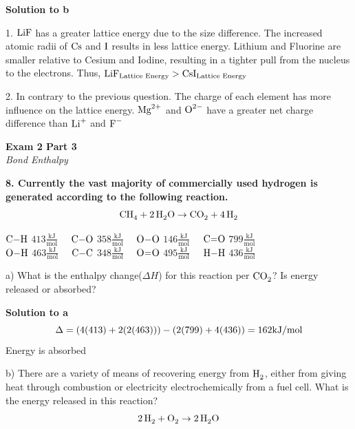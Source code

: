 \documentclass{article}
\begin{document}
    \textbf{Solution to b}

    1. $\ce{LiF}$ has a greater lattice energy due to the size difference. The increased atomic radii of $\ce{Cs}$ and $\ce{I}$ results in less lattice energy. Lithium and Fluorine are smaller relative to Cesium and Iodine, resulting in a tighter pull from the nucleus to the electrons. Thus, $\ce{LiF}_{\text{Lattice Energy}} > \ce{CsI}_{\text{Lattice Energy}}$

    2. In contrary to the previous question. The charge of each element has more influence on the lattice energy. $\ce{Mg^{2+}}$ and $\ce{O^{2-}}$ have a greater net charge difference than $\ce{Li^{+}}$ and $\ce{F^{-}}$
    \pagebreak

    \begin{center}
        \textbf{Exam 2 Part 3}\\
        \textit{Bond Enthalpy}
    \end{center}
    \textbf{8. Currently the vast majority of commercially used hydrogen is generated according to the following reaction.}
    $$\ce{CH4} + \ce{2H2O} \rightarrow \ce{CO2} + \ce{4H2}$$
    \begin{center}
        $\ce{C-H}$ $413 \frac{\si{\kilo\joule}}{\si{\mol}} \quad$
        $\ce{C-O}$ $358 \frac{\si{\kilo\joule}}{\si{\mol}} \quad$
        $\ce{O-O}$ $146 \frac{\si{\kilo\joule}}{\si{\mol}} \quad$
        $\ce{C=O}$ $799 \frac{\si{\kilo\joule}}{\si{\mol}}$\\[.2cm]
        $\ce{O-H}$ $463 \frac{\si{\kilo\joule}}{\si{\mol}} \quad$
        $\ce{C-C}$ $348 \frac{\si{\kilo\joule}}{\si{\mol}} \quad$
        $\ce{O=O}$ $495 \frac{\si{\kilo\joule}}{\si{\mol}} \quad$
        $\ce{H-H}$ $436 \frac{\si{\kilo\joule}}{\si{\mol}}$
    \end{center}

    a) What is the enthalpy change($\Delta H$) for this reaction per $\ce{CO2}$? Is energy released or absorbed?

    \textbf{Solution to a}
    $$ \Delta = (4(413) + 2(2(463))) - (2(799) + 4(436)) = 162 \si[per-mode=symbol]{\kilo\joule\per\mole}$$
    Energy is absorbed

    b) There are a variety of means of recovering energy from $\ce{H2}$, either from giving heat through combustion or electricity electrochemically from a fuel cell. What is the energy released in this reaction?
    $$\ce{2H2} + \ce{O2} \rightarrow \ce{2H2O}$$
\end{document}
